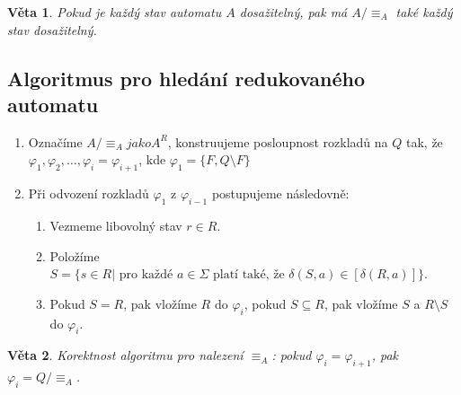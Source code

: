 \documentclass[10pt, a4paper, titlepage]{article}
\theoremstyle{note}
\newtheorem{veta}{Věta}
\begin{document}
\begin{veta}
Pokud je každ\'y stav automatu $A$ dosažiteln\'y, pak m\'a $A/ \equiv_{A}$ tak\'e každ\'y stav dosažiteln\'y.
\end{veta}

\subsection{Algoritmus pro hled\'an\'i redukovan\'eho automatu}

\begin{enumerate}
\item
Označ\'ime $A/ \equiv_{A} jako A^{R}$, konstruujeme posloupnost rozkladů na $Q$ tak, že $\varphi_{1}, \varphi_{2}, \ldots, \varphi_{i} = \varphi_{i+1}$,
kde $\varphi_{1} = \lbrace F, Q \setminus F \rbrace$

\item
Při odvozen\'i rozkladů $\varphi_{1}$ z $\varphi_{i-1}$ postupujeme n\'asledovně:
\begin{enumerate}
\item
Vezmeme libovoln\'y stav $r \in R$.

\item
Polož\'ime $S = \lbrace s \in R | \text{ pro každ\'e } a \in \Sigma \text{ plat\'i tak\'e, že }\delta(S, a) \in [\delta(R, a)] \rbrace$.

\item
Pokud $S = R$, pak vlož\'ime $R$ do $\varphi_{i}$, pokud $S \subseteq R$, pak vlož\'ime $S$ a $R \setminus S$ do $\varphi_{i}$.
\end{enumerate}
\end{enumerate}

\begin{veta}
Korektnost algoritmu pro nalezen\'i $\equiv_{A}$: pokud $\varphi_{i} = \varphi_{i+1}$, pak $\varphi_{i} = Q/ \equiv_{A}$.
\end{veta}
\end{document}
